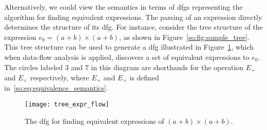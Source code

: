 Alternatively, we could view the semantics in terms of \glspl{dfg} representing
the algorithm for finding equivalent expressions. The parsing of an expression
directly determines the structure of its \gls{dfg}\@. For instance, consider
the tree structure of the expression $e_0 = (a + b) \times (a + b)$, as shown
in Figure~\ref{so:fig:sample_tree}. This tree structure can be used to generate
a \gls{dfg} illustrated in Figure~\ref{so:fig:tree_expr_flow}, which when
data-flow analysis is applied, discovers a set of equivalent expressions to
$e_0$. The circles labeled $3$ and $7$ in this diagram are shorthands for the
operation $E_+$ and $E_\times$ respectively, where $E_+$ and $E_\times$ is
defined in~\eqref{so:eq:equivalence_semantics}.
\begin{figure}[ht]
    \centering
    \texttt{[image: tree\_expr\_flow]}
    \caption{The \gls{dfg} for finding equivalent expressions of
    $(a + b) \times (a + b)$.}\label{so:fig:tree_expr_flow}
\end{figure}

